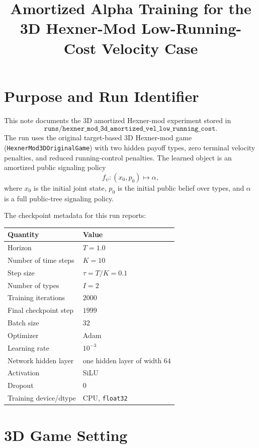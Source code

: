 \documentclass[11pt]{article}
\title{Amortized Alpha Training for the 3D Hexner-Mod Low-Running-Cost Velocity Case}
\author{}
\date{}
\begin{document}
\setcounter{MaxMatrixCols}{20}
\maketitle

\section{Purpose and Run Identifier}

This note documents the 3D amortized Hexner-mod experiment stored in
\[
\texttt{runs/hexner\_mod\_3d\_amortized\_vel\_low\_running\_cost}.
\]
The run uses the original target-based 3D Hexner-mod game
(\texttt{HexnerMod3DOriginalGame}) with two hidden payoff types, zero terminal
velocity penalties, and reduced running-control penalties.  The learned object
is an amortized public signaling policy
\[
    f_\psi : (x_0,p_0) \mapsto \alpha,
\]
where $x_0$ is the initial joint state, $p_0$ is the initial public belief over
types, and $\alpha$ is a full public-tree signaling policy.

The checkpoint metadata for this run reports:
\begin{center}
\begin{tabular}{ll}
\toprule
Quantity & Value \\
\midrule
Horizon & $T=1.0$ \\
Number of time steps & $K=10$ \\
Step size & $\tau = T/K = 0.1$ \\
Number of types & $I=2$ \\
Training iterations & $2000$ \\
Final checkpoint step & $1999$ \\
Batch size & $32$ \\
Optimizer & Adam \\
Learning rate & $10^{-3}$ \\
Network hidden layer & one hidden layer of width $64$ \\
Activation & SiLU \\
Dropout & $0$ \\
Training device/dtype & CPU, \texttt{float32} \\
\bottomrule
\end{tabular}
\end{center}

\section{3D Game Setting}
\end{document}

